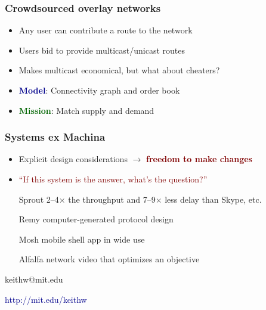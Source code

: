 \documentclass[svgnames]{beamer}
\begin{document}
\begin{frame}
\frametitle{Crowdsourced overlay networks}

\large

\begin{itemize}

\item Any user can contribute a route to the network

\item Users bid to provide multicast/unicast routes

\item Makes multicast economical, but what about cheaters?

\item[]

\item \textcolor{DarkBlue}{\bf Model}: Connectivity graph and order book

\item \textcolor{DarkGreen}{\bf Mission}: Match supply and demand

\end{itemize}

\end{frame}

\begin{frame}

\frametitle{Systems ex Machina}

\begin{itemize}

\item Explicit design considerations $\rightarrow$ \textbf{\textcolor{Maroon}{freedom to make changes}}

\item \textcolor{Maroon}{``If this system is the answer, what's the question?''}

\item[]

\item[Sprout] 2--4$\times$ the throughput and 7--9$\times$ less delay than Skype, etc.

\item[Remy] computer-generated protocol design

\item[Mosh] mobile shell app in wide use

\item[Alfalfa] network video that optimizes an objective

\end{itemize}

\vspace{\baselineskip}

\begin{centering}
keithw@mit.edu

\vspace{7 pt}

\textcolor{DarkBlue}{http://mit.edu/keithw}

\end{centering}

\end{frame}
\end{document}
